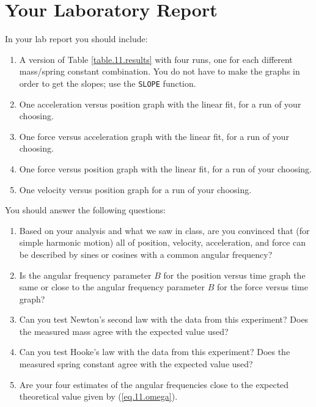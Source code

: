 \section{Your Laboratory Report}
In your lab report you should include:
\begin{enumerate}
    \item A version of Table \ref{table.11.results} with four runs, one for each different mass/spring constant combination. You do not have to make the graphs in order to get the slopes; use the \texttt{SLOPE} function.
    \item One acceleration versus position graph with the linear fit, for a run of your choosing.
    \item One force versus acceleration graph with the linear fit, for a run of your choosing.
    \item One force versus position graph with the linear fit, for a run of your choosing.
    \item One velocity versus position graph for a run of your choosing.
\end{enumerate}
You should answer the following questions:
\begin{enumerate}
    \item Based on your analysis and what we saw in class, are you convinced that (for simple harmonic motion) all of position, velocity, acceleration, and force can be described by sines or cosines with a common angular frequency?
    \item Is the angular frequency parameter $B$ for the position versus time graph the same or close to the angular frequency parameter $B$ for the force versus time graph?
    \item Can you test Newton's second law with the data from this experiment? Does the measured mass agree with the expected value used?
    \item Can you test Hooke's law with the data from this experiment? Does the measured spring constant agree with the expected value used?
    \item Are your four estimates of the angular frequencies close to the expected theoretical value given by (\ref{eq.11.omega}).
\end{enumerate}